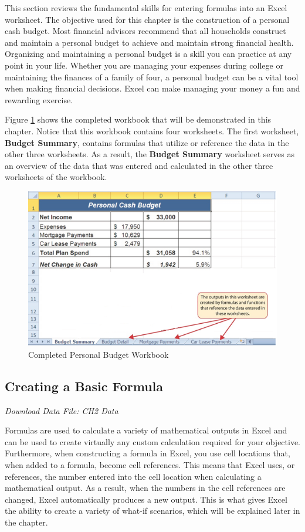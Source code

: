 This section reviews the fundamental skills for entering formulas into an Excel worksheet. The objective used for this chapter is the construction of a personal cash budget. Most financial advisors recommend that all households construct and maintain a personal budget to achieve and maintain strong financial health. Organizing and maintaining a personal budget is a skill you can practice at any point in your life. Whether you are managing your expenses during college or maintaining the finances of a family of four, a personal budget can be a vital tool when making financial decisions. Excel can make managing your money a fun and rewarding exercise.

Figure \ref{02:fig01} shows the completed workbook that will be demonstrated in this chapter. Notice that this workbook contains four worksheets. The first worksheet, \textbf{Budget Summary}, contains formulas that utilize or reference the data in the other three worksheets. As a result, the \textbf{Budget Summary} worksheet serves as an overview of the data that was entered and calculated in the other three worksheets of the workbook.

\begin{figure}[H]
	\centering
	\includegraphics[width=\maxwidth{.95\linewidth}]{gfx/ch02_fig01}
	\caption{Completed Personal Budget Workbook}
	\label{02:fig01}
\end{figure}

\subsection{Creating a Basic Formula}

\textit{Download Data File: CH2 Data}

Formulas are used to calculate a variety of mathematical outputs in Excel and can be used to create virtually any custom calculation required for your objective. Furthermore, when constructing a formula in Excel, you use cell locations that, when added to a formula, become cell references. This means that Excel uses, or references, the number entered into the cell location when calculating a mathematical output. As a result, when the numbers in the cell references are changed, Excel automatically produces a new output. This is what gives Excel the ability to create a variety of what-if scenarios, which will be explained later in the chapter.

